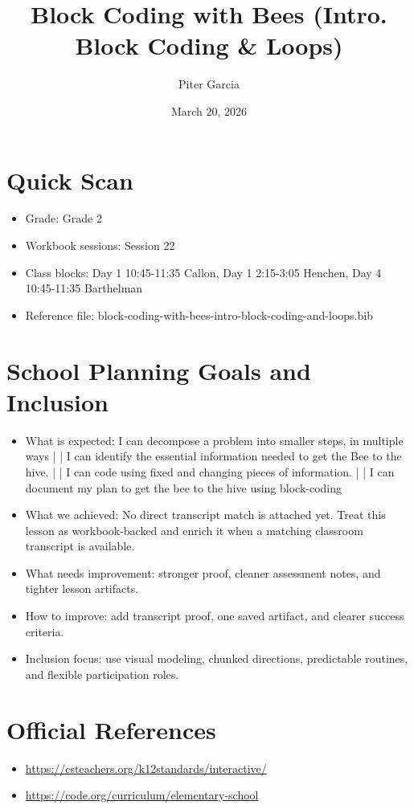 \documentclass[11pt]{article}
\title{Block Coding with Bees (Intro. Block Coding & Loops)}
\author{Piter Garcia}
\date{March 20, 2026}
\begin{document}
    \maketitle
    \section*{Quick Scan}
    \begin{itemize}[leftmargin=*]
    \item Grade: Grade 2
    \item Workbook sessions: Session 22
    \item Class blocks: Day 1 10:45-11:35 Callon, Day 1 2:15-3:05 Henchen, Day 4 10:45-11:35 Barthelman
    \item Reference file: block-coding-with-bees-intro-block-coding-and-loops.bib
    \end{itemize}
    \section*{School Planning Goals and Inclusion}
    \begin{itemize}[leftmargin=*]
    \item What is expected: I can decompose a problem into smaller steps, in multiple ways | | I can identify the essential information needed to get the Bee to the hive. | | I can code using fixed and changing pieces of information. | | I can document my plan to get the bee to the hive using block-coding
    \item What we achieved: No direct transcript match is attached yet. Treat this lesson as workbook-backed and enrich it when a matching classroom transcript is available.
    \item What needs improvement: stronger proof, cleaner assessment notes, and tighter lesson artifacts.
    \item How to improve: add transcript proof, one saved artifact, and clearer success criteria.
    \item Inclusion focus: use visual modeling, chunked directions, predictable routines, and flexible participation roles.
    \end{itemize}
    \section*{Official References}
    \begin{itemize}[leftmargin=*]
    \item \url{https://csteachers.org/k12standards/interactive/}
\item \url{https://code.org/curriculum/elementary-school}

    \end{itemize}
    
\end{document}
